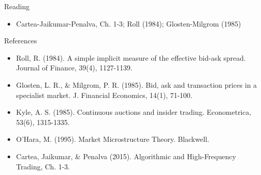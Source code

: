 \documentclass[aspectratio=169,10pt]{beamer}
\begin{document}
\begin{frame}{Reading}
\begin{itemize}
  \item Cartea-Jaikumar-Penalva, Ch. 1-3; Roll (1984); Glosten-Milgrom (1985)
\end{itemize}
\end{frame}

\begin{frame}{References}
\scriptsize\begin{itemize}\setlength{\itemsep}{3pt}
  \item Roll, R. (1984). A simple implicit measure of the effective bid-ask spread. Journal of Finance, 39(4), 1127-1139.
  \item Glosten, L. R., \& Milgrom, P. R. (1985). Bid, ask and transaction prices in a specialist market. J. Financial Economics, 14(1), 71-100.
  \item Kyle, A. S. (1985). Continuous auctions and insider trading. Econometrica, 53(6), 1315-1335.
  \item O'Hara, M. (1995). Market Microstructure Theory. Blackwell.
  \item Cartea, Jaikumar, \& Penalva (2015). Algorithmic and High-Frequency Trading, Ch. 1-3.
\end{itemize}
\end{frame}
\end{document}
